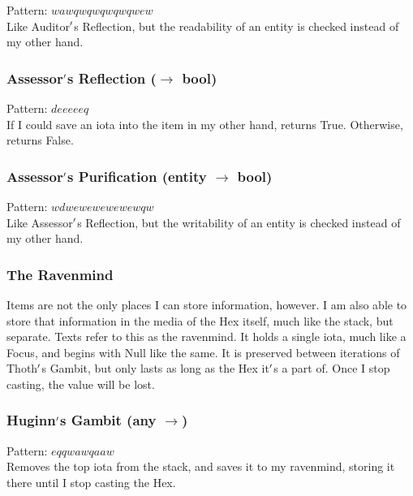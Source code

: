 \documentclass[12pt]{article}
\begin{document}
    Pattern: $wawqwqwqwqwqwew$\\
      Like Auditor$\rq$s Reflection, but the readability of an entity is checked instead of my other hand.\\


  \label{sec: patterns/readwrite@hexcasting:writable}
\subsubsection*{Assessor$\rq$s Reflection ($\rightarrow$ bool)}

    Pattern: $deeeeeq$\\
      If I could save an iota into the item in my other hand, returns True. Otherwise, returns False.\\


  \label{sec: patterns/readwrite@hexcasting:writable/entity}
\subsubsection*{Assessor$\rq$s Purification (entity $\rightarrow$ bool)}

    Pattern: $wdwewewewewewqw$\\
      Like Assessor$\rq$s Reflection, but the writability of an entity is checked instead of my other hand.\\


  \label{sec: patterns/readwrite@hexcasting:local}
\subsubsection*{The Ravenmind}

    Items are not the only places I can store information, however. I am also able to store that information in the media of the Hex itself, much like the stack, but separate. Texts refer to this as the ravenmind. It holds a single iota, much like a Focus, and begins with Null like the same. It is preserved between iterations of Thoth$\rq$s Gambit, but only lasts as long as the Hex it$\rq$s a part of. Once I stop casting, the value will be lost.\\

  \label{sec: patterns/readwrite@hexcasting:write/local}
\subsubsection*{Huginn$\rq$s Gambit (any $\rightarrow$)}

    Pattern: $eqqwawqaaw$\\
      Removes the top iota from the stack, and saves it to my ravenmind, storing it there until I stop casting the Hex.\\
\end{document}
